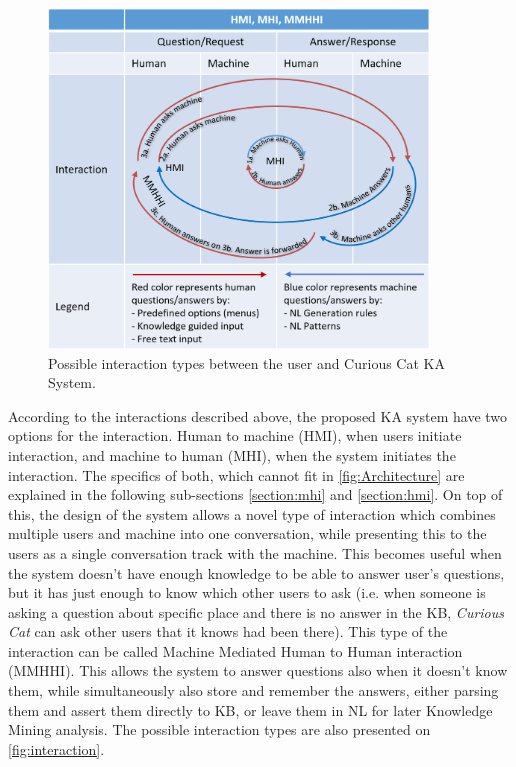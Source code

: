 \begin{figure}[htb]
	\centering
		\includegraphics[width=0.9\textwidth]{figures/interactionLoop.png}
	\caption{Possible interaction types between the user and Curious Cat KA
			 System.}
	\label{fig:interaction}
\end{figure}

According to the interactions described above, the proposed KA system have two 
options for the interaction. Human to machine (HMI), when users initiate 
interaction, and machine to human (MHI), when the system initiates the 
interaction. The specifics of both, which cannot fit in 
\autoref{fig:Architecture} are explained in the following sub-sections 
\ref{section:mhi} and \ref{section:hmi}. On top of this, the design of the 
system allows a novel 
type of interaction which combines multiple users and machine into one 
conversation, while presenting this to the users as a single conversation track
with the machine. This becomes useful when the system doesn't have enough
knowledge to be able to answer user's questions, but it has just enough to know
which other users to ask (i.e. when someone is asking a question about specific
place and there is no answer in the KB, \emph{Curious Cat} can ask other users
that it knows had been there). This type of the interaction can be called
Machine Mediated Human to Human interaction (MMHHI). This allows the system
to answer questions also when it doesn't know them, while simultaneously also
store and remember the answers, either parsing them and assert them directly to 
KB, or leave them in NL for later Knowledge Mining analysis. The possible
interaction types are also presented on \autoref{fig:interaction}.

